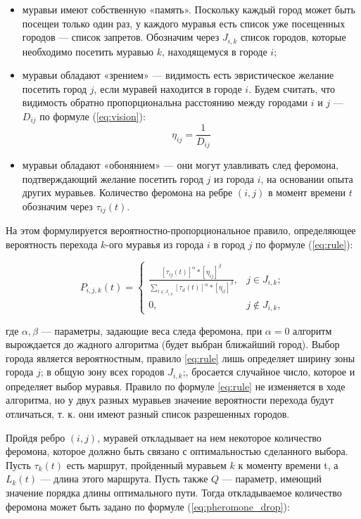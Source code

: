 \begin{itemize}
	\item муравьи имеют собственную «память». Поскольку каждый город может быть посещеи только один раз, у каждого муравья есть список уже посещенных городов --- список запретов. Обозначим через $J_{i,k}$ список городов, которые необходимо посетить муравью $k$, находящемуся в городе $i$;
	\item муравьи обладают «зрением» --- видимость есть эвристическое желание посетить город $j$, если муравей находится в городе $i$. Будем считать, что видимость обратно пропорциональна расстоянию между городами $i$ и $j$ --- $D_{ij}$ по формуле (\ref{eq:vision}):
	\begin{equation}
		\label{eq:vision}
		\eta_{ij} = \frac{1}{D_{ij}}
	\end{equation}
	\item муравьи обладают «обонянием» — они могут улавливать след феромона, подтверждающий желание посетить город $j$ из города $i$, на основании опыта других муравьев. Количество феромона на ребре $(i,j)$ в момент времени $t$ обозначим через $\tau_{ij}(t)$.
\end{itemize}

На этом формулируется вероятностно-пропорциональное правило, определяющее вероятность перехода $k$-ого муравья из города $i$ в город $j$ по формуле (\ref{eq:rule}):

\begin{equation}
	\label{eq:rule}
	P_{i,j,k}(t) =
	\begin{cases}
		 \frac{[\tau_{ij}(t)]^\alpha*[\eta_{ij}]^\beta}{\sum_{l\in J_{i,k}}^{}[\tau_{il}(t)]^\alpha * [\eta_{il}]^\beta}, & j \in J_{i,k};\\
		0, & j \notin J_{i,k},
	\end{cases}
\end{equation}


где $\alpha, \beta$ — параметры, задающие веса следа феромона, при $\alpha=0$ алгоритм вырождается до жадного алгоритма (будет выбран ближайший город). Выбор города является вероятностным, правило \ref{eq:rule} лишь определяет ширину
зоны города $j$; в общую зону всех городов $J_{i,k}$;, бросается случайное число, которое и определяет выбор муравья. Правило по формуле \ref{eq:rule} не изменяется в ходе алгоритма, но у двух разных муравьев значение вероятности перехода будут отличаться, т. к. они имеют разный список разрешенных городов.

Пройдя ребро $(i,j)$, муравей откладывает на нем некоторое количество феромона, которое должно быть связано с оптимальностью сделанного выбора. Пусть $\tau_k(t)$ есть маршрут, пройденный муравьем $k$ к моменту времени t, а $L_k(t)$ --- длина этого маршрута. Пусть также $Q$ --- параметр, имеющий значение порядка длины оптимального пути. Тогда откладываемое количество феромона может быть задано по формуле (\ref{eq:pheromone_drop}):

